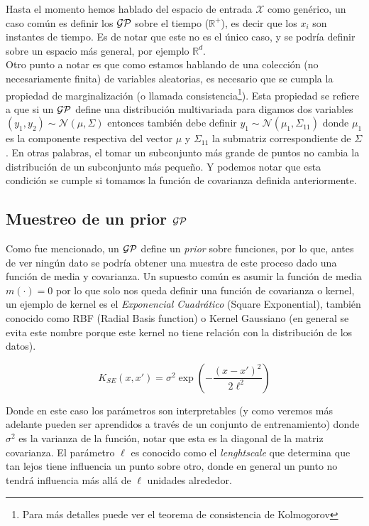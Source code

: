 Hasta el momento hemos hablado del espacio de entrada $\mathcal{X}$ como genérico, un caso común es definir los $\mathcal{GP}$ sobre el tiempo ($\mathbb{R}^{+}$), es decir que los $x_i$ son instantes de tiempo. Es de notar que este no es el único caso, y se podría definir sobre un espacio más general, por ejemplo $\mathbb{R}^d$.\\

Otro punto a notar es que como estamos hablando de una colección (no necesariamente finita) de variables aleatorias, es necesario que se cumpla la propiedad de marginalización (o llamada consistencia\footnote{Para más detalles puede ver el teorema de consistencia de Kolmogorov}). Esta propiedad se refiere a que si un $\mathcal{GP}$ define una distribución multivariada para digamos dos variables $(y_1, y_2) \sim \mathcal{N}(\mu, \Sigma)$ entonces también debe definir $y_1 \sim \mathcal{N}(\mu_1, \Sigma_{11})$ donde $\mu_1$ es la componente respectiva del vector $\mu$ y $\Sigma_{11}$ la submatriz correspondiente de $\Sigma$. En otras palabras, el tomar un subconjunto más grande de puntos no cambia la distribución de un subconjunto más pequeño. Y podemos notar que esta condición se cumple si tomamos la función de covarianza definida anteriormente.

\subsection{Muestreo de un prior $\mathcal{GP}$}

Como fue mencionado, un $\mathcal{GP}$ define un \textit{prior} sobre funciones, por lo que, antes de ver ningún dato se podría obtener una muestra de este proceso dado una función de media y covarianza. Un supuesto común es asumir la función de media $m(\cdot)=0$ por lo que solo nos queda definir una función de covarianza o kernel, un ejemplo de kernel es el \textit{Exponencial Cuadrático} (Square Exponential), también conocido como RBF (Radial Basis function) o Kernel Gaussiano (en general se evita este nombre porque este kernel no tiene relación con la distribución de los datos).

\begin{equation}
	K_{SE}(x, x') = \sigma^2 \exp\left( - \frac{\left( x- x'\right)^2}{2\ell^2} \right)
\end{equation}

Donde en este caso los parámetros son interpretables (y como veremos más adelante pueden ser aprendidos a través de un conjunto de entrenamiento) donde $\sigma^2$ es la varianza de la función, notar que esta es la diagonal de la matriz covarianza. El parámetro $\ell$ es conocido como el \textit{lenghtscale} que determina que tan lejos tiene influencia un punto sobre otro, donde en general un punto no tendrá influencia más allá de $\ell$ unidades alrededor.\\

